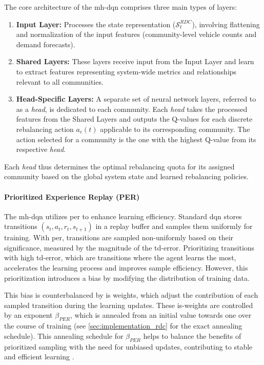 The core architecture of the \gls{mh-dqn} comprises three main types of layers:
\begin{enumerate}
    \item \textbf{Input Layer:}
    Processes the state representation ($\mathcal{S}^{RDC}_t$), involving flattening and normalization of the input features (community-level vehicle counts and demand forecasts).
    \item \textbf{Shared Layers:}
    These layers receive input from the Input Layer and learn to extract features representing system-wide metrics and relationships relevant to all communities.
    \item \textbf{Head-Specific Layers:}
    A separate set of neural network layers, referred to as a \textit{head}, is dedicated to each community.
    Each \textit{head} takes the processed features from the Shared Layers and outputs the Q-values for each discrete rebalancing action $a_c(t)$ applicable to its corresponding community.
    The action selected for a community is the one with the highest Q-value from its respective \textit{head}.
\end{enumerate}
Each \textit{head} thus determines the optimal rebalancing quota for its assigned community based on the global system state and learned rebalancing policies.

\paragraph{Prioritized Experience Replay (PER)}
The \gls{mh-dqn} utilizes \gls{per} \cite{schaul_prioritized_2016} to enhance learning efficiency.
Standard \gls{dqn} stores transitions $(s_t, a_t, r_t, s_{t+1})$ in a replay buffer and samples them uniformly for training.
With \gls{per}, transitions are sampled non-uniformly based on their significance, measured by the magnitude of the \gls{td-error}.
Prioritizing transitions with high \gls{td-error}, which are transitions where the agent learns the most, accelerates the learning process and improves sample efficiency.
However, this prioritization introduces a bias by modifying the distribution of training data.

This bias is counterbalanced by \gls{is} weights, which adjust the contribution of each sampled transition during the learning updates.
These \gls{is}-weights are controlled by an exponent $\beta_{PER}$, which is annealed from an initial value towards one over the course of training (see \autoref{sec:implementation_rdc} for the exact annealing schedule).
This annealing schedule for $\beta_{PER}$ helps to balance the benefits of prioritized sampling with the need for unbiased updates, contributing to stable and efficient learning \cite{schaul_prioritized_2016}.

